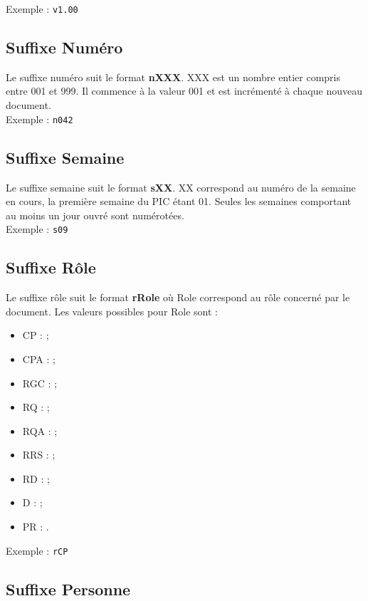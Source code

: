 Exemple : \verb+v1.00+

\subsection{Suffixe Numéro}
\label{suffixe_numero}

Le suffixe numéro suit le format \textbf{nXXX}. XXX est un nombre entier compris entre 001 et 999. Il commence à la valeur 001 et est incrémenté à chaque nouveau document.\\

Exemple : \verb+n042+\\

\subsection{Suffixe Semaine}
\label{suffixe_semaine}

Le suffixe semaine suit le format \textbf{sXX}. XX correspond au numéro de la semaine en cours, la première semaine du PIC étant 01. Seules les semaines comportant au moins un jour ouvré sont numérotées.\\

Exemple : \verb+s09+

\subsection{Suffixe Rôle}
\label{suffixe_role}

Le suffixe rôle suit le format \textbf{rRole} où Role correspond au rôle concerné par le document. Les valeurs possibles pour Role sont : 
\begin{itemize}
\item CP :  \CP;
\item CPA : \CPA;
\item RGC : \RGC;
\item RQ : \RQ;
\item RQA : \RQA;
\item RRS : \RRS;
\item RD : \RD;
\item D : \D;
\item PR : \PDR.\\
\end{itemize}

Exemple : \verb+rCP+

\subsection{Suffixe Personne}
\label{suffixe_personne}

